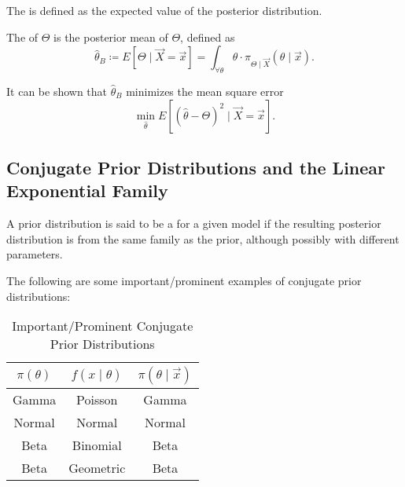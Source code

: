\documentclass[notoc,notitlepage]{tufte-book}
\begin{document}
\begin{defn}\label{defn:posterior_mean}
  The  is defined as the expected value of the posterior
  distribution.
\end{defn}

\begin{defn}\label{defn:bayes_estimator}
  The  of $\Theta$ is the posterior mean of $\Theta$,
  defined as
  \begin{equation*}
    \hat{\theta}_B \coloneqq E[\Theta \mid \vec{X} = \vec{x}]
    = \int_{\forall \theta} \theta \cdot \pi_{\Theta \mid \vec{X}}(\theta \mid
    \vec{x}).
  \end{equation*}
\end{defn}

\begin{note}
  It can be shown that $\hat{\theta}_B$ minimizes the mean square error
  \begin{equation*}
    \min_{\hat{\theta}} E \left[ \left( \hat{\theta} - \Theta \right)^2 \mid
    \vec{X} = \vec{x} \right].
  \end{equation*}
\end{note}

\subsection{Conjugate Prior Distributions and the Linear Exponential Family}%
\label{sub:conjugate_prior_distributions_and_the_linear_exponential_family}

\begin{defn}\label{defn:conjugate_prior_distribution}
  A prior distribution is said to be a 
  for a given model if the resulting posterior distribution is from the same
  family as the prior, although possibly with different parameters.
\end{defn}

\begin{eg}\label{eg:conjugate_prior_distributions_egs}
  The following are some important/prominent examples of conjugate prior
  distributions:
  \begin{table}[ht]
    \centering
    \caption{Important/Prominent Conjugate Prior Distributions}
    \label{table:important_prominent_conjugate_prior_distributions}
    \begin{tabular}{c c c}
      $\pi(\theta)$ & $f(x \mid \theta)$ & $\pi(\theta \mid \vec{x})$ \\
      \hline
      Gamma         & Poisson            & Gamma \\
      Normal        & Normal             & Normal \\
      Beta          & Binomial           & Beta \\
      Beta          & Geometric          & Beta
    \end{tabular}
  \end{table}
\end{eg}
\end{document}
